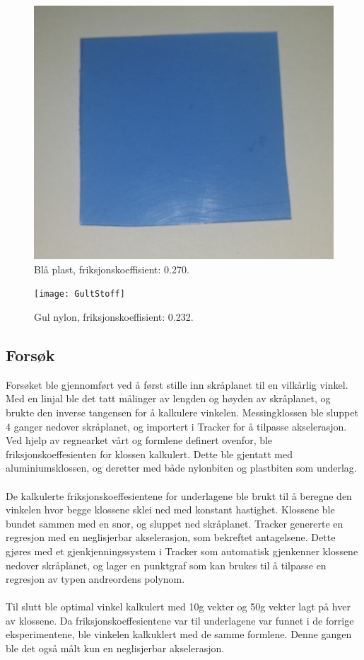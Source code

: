 \documentclass[10pt,a4paper]{report}
\begin{document}
\begin{figure}
    \centerline{\includegraphics[scale=0.05]{BlaaPlast}}
    \caption{Blå plast, friksjonskoeffisient: 0.270.}
    \label{fig:1}
\end{figure}
\begin{figure}
    \centerline{\texttt{[image: GultStoff]}}
    \caption{Gul nylon, friksjonskoeffisient: 0.232.}
    \label{fig:2}
\end{figure}

\subsection*{Forsøk}
Forsøket ble gjennomført ved å først stille inn skråplanet til en vilkårlig vinkel. Med en linjal ble det tatt målinger av lengden og høyden av skråplanet, og brukte den inverse tangensen for å kalkulere vinkelen. Messingklossen ble sluppet 4 ganger nedover skråplanet, og importert i Tracker for å tilpasse akselerasjon. Ved hjelp av regnearket vårt og formlene definert ovenfor, ble friksjonskoeffesienten for klossen kalkulert. Dette ble gjentatt med aluminiumsklossen, og deretter med både nylonbiten og plastbiten som underlag. \\
\\De kalkulerte friksjonskoeffesientene for underlagene ble brukt til å beregne den vinkelen hvor begge klossene sklei ned med konstant hastighet. Klossene ble bundet sammen med en snor, og sluppet ned skråplanet. Tracker genererte en regresjon med en neglisjerbar akselerasjon, som bekreftet antagelsene. Dette gjøres med et gjenkjenningssystem i Tracker som automatisk gjenkenner klossene nedover skråplanet, og lager en punktgraf som kan brukes til å tilpasse en regresjon av typen andreordens polynom.\\
\\Til slutt ble optimal vinkel kalkulert med 10g vekter og 50g vekter lagt på hver av klossene. Da friksjonskoeffesientene var til underlagene var funnet i de forrige eksperimentene, ble vinkelen kalkuklert med de samme formlene. Denne gangen ble det også målt kun en neglisjerbar akselerasjon.
\end{document}
